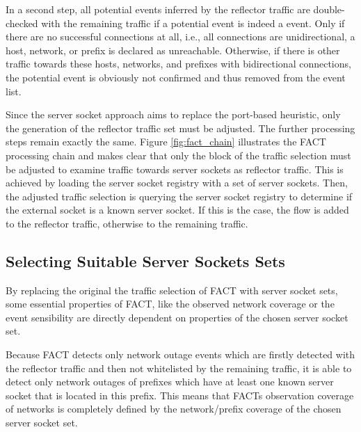 In a second step, all potential events inferred by the reflector traffic are  double-checked with the remaining traffic if a potential event is indeed a  event. 
Only if there are no successful connections at all, i.e., all connections are unidirectional, a host, network, or prefix is declared as unreachable. 
Otherwise, if there is other traffic towards these hosts, networks, and prefixes with bidirectional connections, the potential event is obviously not confirmed and thus removed from the event list. 

Since the \gls{server socket} approach aims to replace the port-based heuristic,  only the generation of the reflector traffic set must be adjusted. 
The further processing steps remain exactly the same. 
Figure \ref{fig:fact_chain} illustrates the \gls{FACT} processing chain and makes clear that only the block of the traffic selection must be adjusted to examine traffic towards \glspl{server socket} as reflector traffic. 
This is achieved by loading the \gls{server socket} registry with a set of \glspl{server socket}. 
Then, the adjusted traffic selection is querying the server socket registry to determine if the external socket is a known \gls{server socket}. 
If this is the case, the flow is added to the reflector traffic, otherwise to the remaining traffic. 

\subsection{Selecting Suitable Server Sockets Sets\label{section:ses_selection}}
By replacing the original the traffic selection of \gls{FACT} with \gls{server socket} sets,  some essential properties of \gls{FACT}, like the observed network coverage or the event sensibility are directly dependent on properties of the chosen \gls{server socket} set. 

Because \gls{FACT} detects only network outage events which are firstly detected  with the reflector traffic and then not whitelisted by the remaining traffic, it  is able to detect only network outages of prefixes which have at least one known  server socket that is located in this prefix. This means that FACTs observation  coverage of networks is completely defined by the network/prefix coverage of the  chosen \gls{server socket} set. 

